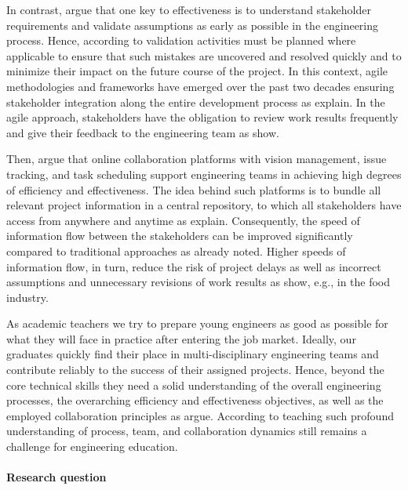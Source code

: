 \documentclass{PDS}
\begin{document}
In contrast, \cite{Maalem_2016} argue that one key to effectiveness is to understand stakeholder requirements and validate assumptions as early as possible in the engineering process.
Hence, according to \cite{Mobin_2019} validation activities must be planned where applicable to ensure that such mistakes are uncovered and resolved quickly and to minimize their impact on the future course of the project.
In this context, agile methodologies and frameworks have emerged over the past two decades ensuring stakeholder integration along the entire development process as \cite{Chan_2009} explain.
In the agile approach, stakeholders have the obligation to review work results frequently and give their feedback to the engineering team as \cite{Deininger_2019} show.

Then, \cite{Hackenberg_2023} argue that online collaboration platforms with vision management, issue tracking, and task scheduling support engineering teams in achieving high degrees of efficiency and effectiveness.
The idea behind such platforms is to bundle all relevant project information in a central repository, to which all stakeholders have access from anywhere and anytime as \cite{Tony_Liu_2001} explain.
Consequently, the speed of information flow between the stakeholders can be improved significantly compared to traditional approaches as \cite{Kraemer_1988} already noted.
Higher speeds of information flow, in turn, reduce the risk of project delays as well as incorrect assumptions and unnecessary revisions of work results as \cite{Novak_2009} show, e.g., in the food industry.

As academic teachers we try to prepare young engineers as good as possible for what they will face in practice after entering the job market.
Ideally, our graduates quickly find their place in multi-disciplinary engineering teams and contribute reliably to the success of their assigned projects.
Hence, beyond the core technical skills they need a solid understanding of the overall engineering processes, the overarching efficiency and effectiveness objectives, as well as the employed collaboration principles as \cite{Deshpande_2011} argue.
According to \cite{Meyer_2020} teaching such profound understanding of process, team, and collaboration dynamics still remains a challenge for engineering education.

\paragraph{Research question}
\end{document}
